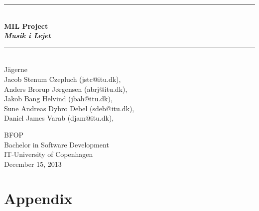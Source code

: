 \documentclass[a4paper,11pt]{article}
\begin{document}
\begin{titlepage}
\centering \parindent=0pt
\newcommand{\HRule}{\rule{\textwidth}{1mm}}
 \HRule\\[1cm]\Huge\bfseries
MIL Project\\\emph{Musik i Lejet}\\[0.7cm]
\HRule\\[4cm]  \large  Jägerne
\\Jacob Stenum Czepluch (jstc@itu.dk), \\
Anders Brorup Jørgensen (abrj@itu.dk), \\
Jakob Bang Helvind (jbah@itu.dk), \\
Sune Andreas Dybro Debel (sdeb@itu.dk), \\
Daniel James Varab (djam@itu.dk), \\

 \normalsize %
\thispagestyle{empty}
\begin{flushleft}
BFOP \\
Bachelor in Software Development\\


IT-University of Copenhagen\\
December 15, 2013 \end{flushleft}
\end{titlepage}
\tableofcontents
\pagebreak
\pagebreak
{}
\setcounter{page}{1}





\appendix
\part{Appendix}


















%
\end{document}
